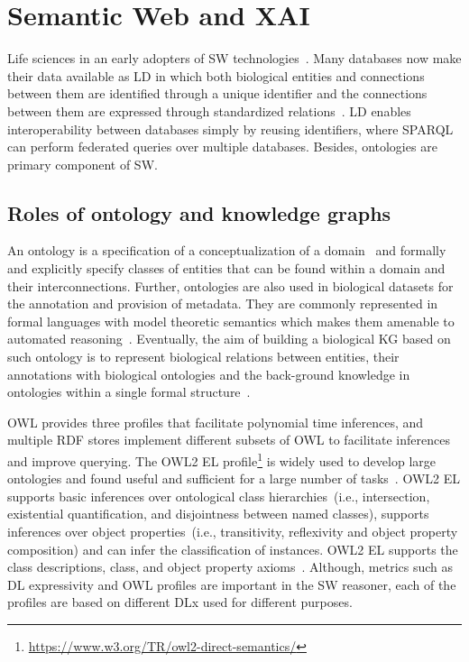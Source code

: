 
\iffalse
\section{Semantic Web and XAI}
Life sciences in an early adopters of SW technologies~\cite{karim2018improving}. Many databases now make their data available as LD in which both biological entities and connections between them are identified through a unique identifier and the connections between them are expressed through standardized relations~\cite{alshahrani2017neuro}. LD enables interoperability between databases simply by reusing identifiers, where SPARQL can perform federated queries over multiple databases. Besides, ontologies are primary component of SW. 

\subsection{Roles of ontology and knowledge graphs}
An ontology is a specification of a conceptualization of a domain~\cite{alshahrani2017neuro} and formally and explicitly specify classes of entities that can be found within a domain and their interconnections. Further, ontologies are also used in biological datasets for the annotation and provision of metadata. They are commonly represented in formal languages with model theoretic semantics which makes them amenable to automated reasoning~\cite{alshahrani2017neuro}. Eventually, the aim of building a biological KG based on such ontology is to represent biological relations between entities, their annotations with biological ontologies and the back-ground knowledge in ontologies within a single formal structure~\cite{alshahrani2017neuro}. 

\hspace*{3.5mm} OWL provides three profiles that facilitate polynomial time inferences, and multiple RDF stores implement different subsets of OWL to facilitate inferences and improve querying. The OWL2 EL profile\footnote{\url{https://www.w3.org/TR/owl2-direct-semantics/}} is widely used to develop  large ontologies and found useful and sufficient for a large number of tasks~\cite{alshahrani2017neuro}. OWL2 EL supports basic inferences over ontological class hierarchies~(i.e., intersection, existential quantification, and disjointness between named classes), supports inferences over object properties~(i.e., transitivity, reflexivity and object property composition) and can infer the classification of instances. OWL2 EL supports the class descriptions, class, and object property axioms~\cite{alshahrani2017neuro}. Although, metrics such as DL expressivity and OWL profiles are important in the SW reasoner, each of the profiles are based on different DLx used for different purposes. 

